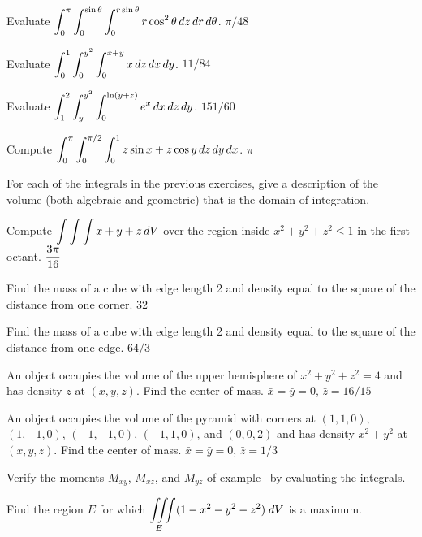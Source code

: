 \exercise Evaluate 
$\displaystyle\int_{0}^{\pi}\int_{0}^{\sin\theta}\int_{0}^{r\sin\theta}
r\cos^2\theta\,dz\,dr\,d\theta$.
\answer $\pi/48$
\endanswer
\endexercise

\exercise Evaluate $\displaystyle\int_{0}^{1}\int_{0}^{y^2}\int_{0}^{x+y}
x\,dz\,dx\,dy$.
\answer $11/84$
\endanswer
\endexercise

\exercise Evaluate $\displaystyle\int_{1}^{2}\int_{y}^{y^2}\int_{0}^{\ln(y+z)}
e^x\,dx\,dz\,dy$.
\answer $151/60$
\endanswer
\endexercise

\exercise Compute $\displaystyle
\int_0^\pi\int_0^{\pi/2}\int_0^1 z\sin x+z\cos y\,dz\,dy\,dx$.
\answer $\pi$
\endanswer
\endexercise

\exercise For each of the integrals in the previous exercises, give a
description of the volume (both algebraic and geometric) that is the
domain of integration.
\endexercise

\exercise Compute $\displaystyle\int\int\int
x+y+z\,dV$ over the region inside
$x^2+y^2+z^2\le 1$ in the first octant.
\answer $\displaystyle {3\pi\over16}$
\endanswer
\endexercise

\exercise Find the mass of a cube with edge length 2 and density equal
to the square of the distance from one corner.
\answer $32$
\endanswer
\endexercise

\exercise Find the mass of a cube with edge length 2 and density equal
to the square of the distance from one edge.
\answer $64/3$
\endanswer
\endexercise

\exercise An object occupies the volume of the upper hemisphere of 
$x^2+y^2+z^2=4$ and has density $z$ at $(x,y,z)$. Find the center of mass.
\answer $\bar x=\bar y=0$, $\bar z=16/15$
\endanswer
\endexercise

\exercise An object occupies the volume of the pyramid with corners at 
$(1,1,0)$, $(1,-1,0)$, $(-1,-1,0)$, $(-1,1,0)$, and $(0,0,2)$ and has
density $x^2+y^2$ at $(x,y,z)$. Find the center of mass.
\answer $\bar x=\bar y=0$, $\bar z=1/3$
\endanswer
\endexercise

\exercise Verify the moments $M_{xy}$, $M_{xz}$, and $M_{yz}$
of example~ by evaluating the
integrals. 

\endexercise

\exercise Find the region $E$ for which $\ds\tint{E}
  (1-x^2-y^2-z^2) \; dV$ is a maximum.

\endexercise

\endexercises

